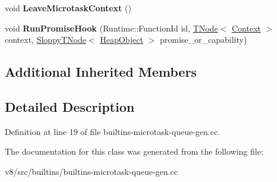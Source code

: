 \begin{DoxyCompactItemize}
void {\bfseries Leave\+Microtask\+Context} ()
\item 
\mbox{\label{classv8_1_1internal_1_1MicrotaskQueueBuiltinsAssembler_ad0fc74456e51fc2bb2031d57f881f8dd}} 
void {\bfseries Run\+Promise\+Hook} (Runtime\+::\+Function\+Id id, \mbox{\hyperlink{classv8_1_1internal_1_1compiler_1_1TNode}{T\+Node}}$<$ \mbox{\hyperlink{classv8_1_1internal_1_1Context}{Context}} $>$ context, \mbox{\hyperlink{classv8_1_1internal_1_1compiler_1_1SloppyTNode}{Sloppy\+T\+Node}}$<$ \mbox{\hyperlink{classv8_1_1internal_1_1HeapObject}{Heap\+Object}} $>$ promise\+\_\+or\+\_\+capability)
\end{DoxyCompactItemize}
\subsection*{Additional Inherited Members}


\subsection{Detailed Description}


Definition at line 19 of file builtins-\/microtask-\/queue-\/gen.\+cc.



The documentation for this class was generated from the following file\+:\begin{DoxyCompactItemize}
\item 
v8/src/builtins/builtins-\/microtask-\/queue-\/gen.\+cc\end{DoxyCompactItemize}
